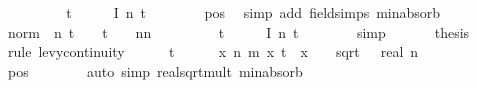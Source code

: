 {\ \ \ \ \isamarkupfalse%
\ \isamarkupfalse%
\ {\isachardoublequoteopen}{\isasymdots}\ {\isacharequal}\ {\isacharparenleft}t\ {\isacharslash}\ {\isacharparenleft}{}\ {\isacharasterisk}\ {\isasymsigma}\ {\isacharasterisk}\ {\isacharquery}I\ n\ t{\isacharparenright}{\isachardoublequoteclose}\isanewline
\ \ \ \ \ \ \isamarkupfalse%
\ {\isasymsigma}{\isacharunderscore}pos\ \isamarkupfalse%
\ {\isacharparenleft}simp\ add{\isacharcolon}\ field{\isacharunderscore}simps\ min{\isacharunderscore}absorb{}{\isacharparenright}\isanewline
\ \ \ \ \isamarkupfalse%
\ \isamarkupfalse%
\ {\isachardoublequoteopen}norm\ {\isacharparenleft}{\isasymphi}\ n\ t\ {\isacharminus}\ {\isacharparenleft}{}\ {\isacharplus}\ {\isacharparenleft}{\isacharminus}{\isacharparenleft}t{\isacharcircum}{}{\isacharparenright}\ {\isacharslash}\ {}{\isacharparenright}\ {\isacharslash}\ n{\isacharparenright}{\isacharcircum}n{\isacharparenright}\ {\isasymle}\isanewline
\ \ \ \ \ \ \ \ {\isacharparenleft}t\ {\isacharslash}\ {\isacharparenleft}{}\ {\isacharasterisk}\ {\isasymsigma}\ {\isacharasterisk}\ {\isacharquery}I\ n\ t{\isacharparenright}{\isachardoublequoteclose}\isanewline
\ \ \ \ \ \ \isamarkupfalse%
\ simp\isanewline
\ \ \isamarkupfalse%
\isanewline
\isanewline
\ \ \isamarkupfalse%
\ {\isacharquery}thesis\isanewline
\ \ \isamarkupfalse%
\ {\isacharparenleft}rule\ levy{\isacharunderscore}continuity{\isacharparenright}\isanewline
\ \ \ \ \isamarkupfalse%
\ t\isanewline
\ \ \ \ \isamarkupfalse%
\ {\isachardoublequoteopen}{\isasymAnd}x{\isachardot}\ {\isacharparenleft}{\isasymlambda}n{\isachardot}\ {\isacharquery}m\ x\ {\isacharparenleft}{\isasymbar}t{\isasymbar}\ {\isacharasterisk}\ {\isasymbar}x{\isasymbar}\ {\isacharcircum}\ {}\ {\isacharslash}\ {\isasymbar}sqrt\ {\isacharparenleft}{\isasymsigma}\ {\isacharasterisk}\ real\ n{\isacharparenright}{\isasymbar}{\isacharparenright}{\isacharparenright}\ {\isasymlonglonglongrightarrow}\ {}{\isachardoublequoteclose}\isanewline
\ \ \ \ \ \ \isamarkupfalse%
\ {\isasymsigma}{\isacharunderscore}pos\isanewline
\ \ \ \ \ \ \isamarkupfalse%
\ {\isacharparenleft}auto\ simp{\isacharcolon}\ real{\isacharunderscore}sqrt{\isacharunderscore}mult\ min{\isacharunderscore}absorb{}\isanewline
}
